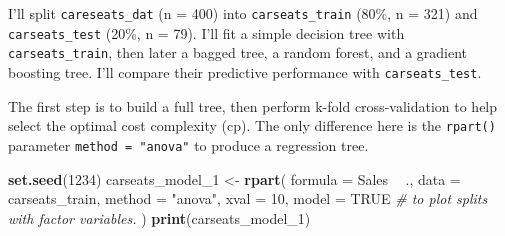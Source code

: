 \documentclass[]{book}
\newenvironment{Shaded}{\begin{snugshade}}{\end{snugshade}}
\newcommand{\CommentTok}[1]{\textcolor[rgb]{0.56,0.35,0.01}{\textit{#1}}}
\newcommand{\DataTypeTok}[1]{\textcolor[rgb]{0.13,0.29,0.53}{#1}}
\newcommand{\DecValTok}[1]{\textcolor[rgb]{0.00,0.00,0.81}{#1}}
\newcommand{\FloatTok}[1]{\textcolor[rgb]{0.00,0.00,0.81}{#1}}
\newcommand{\KeywordTok}[1]{\textcolor[rgb]{0.13,0.29,0.53}{\textbf{#1}}}
\newcommand{\NormalTok}[1]{#1}
\newcommand{\OperatorTok}[1]{\textcolor[rgb]{0.81,0.36,0.00}{\textbf{#1}}}
\newcommand{\OtherTok}[1]{\textcolor[rgb]{0.56,0.35,0.01}{#1}}
\newcommand{\StringTok}[1]{\textcolor[rgb]{0.31,0.60,0.02}{#1}}
\begin{document}
I'll split \texttt{careseats\_dat} (n = 400) into \texttt{carseats\_train} (80\%, n = 321) and \texttt{carseats\_test} (20\%, n = 79). I'll fit a simple decision tree with \texttt{carseats\_train}, then later a bagged tree, a random forest, and a gradient boosting tree. I'll compare their predictive performance with \texttt{carseats\_test}.

\begin{Shaded}
\end{Shaded}

The first step is to build a full tree, then perform k-fold cross-validation to help select the optimal cost complexity (cp). The only difference here is the \texttt{rpart()} parameter \texttt{method\ =\ "anova"} to produce a regression tree.

\begin{Shaded}
\begin{Highlighting}[]
\KeywordTok{set.seed}\NormalTok{(}\DecValTok{1234}\NormalTok{)}
\NormalTok{carseats_model_}\DecValTok{1}\NormalTok{ <-}\StringTok{ }\KeywordTok{rpart}\NormalTok{(}
   \DataTypeTok{formula =}\NormalTok{ Sales }\OperatorTok{~}\StringTok{ }\NormalTok{.,}
   \DataTypeTok{data =}\NormalTok{ carseats_train,}
   \DataTypeTok{method =} \StringTok{"anova"}\NormalTok{, }
   \DataTypeTok{xval =} \DecValTok{10}\NormalTok{,}
   \DataTypeTok{model =} \OtherTok{TRUE}  \CommentTok{# to plot splits with factor variables.}
\NormalTok{)}
\KeywordTok{print}\NormalTok{(carseats_model_}\DecValTok{1}\NormalTok{)}
\end{Highlighting}
\end{Shaded}
\end{document}
